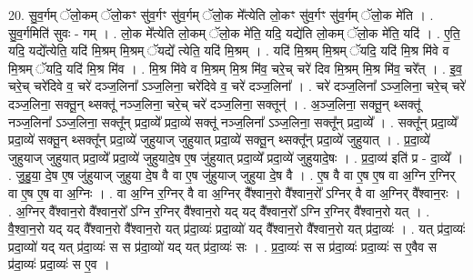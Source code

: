 \documentclass[17pt]{extarticle}
\begin{document}
20. सु॒व॒र्गम् ॅलो॒कम् ॅलो॒कꣳ सु॑व॒र्गꣳ सु॑व॒र्गम् ॅलो॒क मे᳚त्येति लो॒कꣳ सु॑व॒र्गꣳ सु॑व॒र्गम् ॅलो॒क मे॑ति । . सु॒व॒र्गमिति॑ सुवः - गम् । . लो॒क मे᳚त्येति लो॒कम् ॅलो॒क मे॑ति॒ यदि॒ यद्ये॑ति लो॒कम् ॅलो॒क मे॑ति॒ यदि॑ । . ए॒ति॒ यदि॒ यद्ये᳚त्येति॒ यदि॑ मि॒श्रम् मि॒श्रम् ॅयद्ये᳚ त्येति॒ यदि॑ मि॒श्रम् । . यदि॑ मि॒श्रम् मि॒श्रम् ॅयदि॒ यदि॑ मि॒श्र मि॑वे व मि॒श्रम् ॅयदि॒ यदि॑ मि॒श्र मि॑व । . मि॒श्र मि॑वे व मि॒श्रम् मि॒श्र मि॑व॒ चरे॒च् चरे॑ दिव मि॒श्रम् मि॒श्र मि॑व॒ चरे᳚त् । . इ॒व॒ चरे॒च् चरे॑दिवे व॒ चरे॑ दञ्ज॒लिना᳚ ऽञ्ज॒लिना॒ चरे॑दिवे व॒ चरे॑ दञ्ज॒लिना᳚ । . चरे॑ दञ्ज॒लिना᳚ ऽञ्ज॒लिना॒ चरे॒च् चरे॑ दञ्ज॒लिना॒ सक्तू॒न् थ्सक्तू॑ नञ्ज॒लिना॒ चरे॒च् चरे॑ दञ्ज॒लिना॒ सक्तून्॑ । . अ॒ञ्ज॒लिना॒ सक्तू॒न् थ्सक्तू॑ नञ्ज॒लिना᳚ ऽञ्ज॒लिना॒ सक्तू᳚न् प्रदा॒व्ये᳚ प्रदा॒व्ये॑ सक्तू॑ नञ्ज॒लिना᳚ ऽञ्ज॒लिना॒ 
सक्तू᳚न् प्रदा॒व्ये᳚ । . सक्तू᳚न् प्रदा॒व्ये᳚ प्रदा॒व्ये॑ सक्तू॒न् थ्सक्तू᳚न् प्रदा॒व्ये॑ जुहुयाज् जुहुयात् प्रदा॒व्ये॑ सक्तू॒न् थ्सक्तू᳚न् प्रदा॒व्ये॑ जुहुयात् । . प्र॒दा॒व्ये॑ जुहुयाज् जुहुयात् प्रदा॒व्ये᳚ प्रदा॒व्ये॑ जुहुयादे॒ष ए॒ष जु॑हुयात् प्रदा॒व्ये᳚ प्रदा॒व्ये॑ जुहुयादे॒षः । . प्र॒दा॒व्य॑ इति॑ प्र - दा॒व्ये᳚ । . जु॒हु॒या॒ दे॒ष ए॒ष जु॑हुयाज् जुहुया दे॒ष वै वा ए॒ष जु॑हुयाज् जुहुया दे॒ष वै । . ए॒ष वै वा ए॒ष ए॒ष वा अ॒ग्नि र॒ग्निर् वा ए॒ष ए॒ष वा अ॒ग्निः । . वा अ॒ग्नि र॒ग्निर् वै वा अ॒ग्निर् वै᳚श्वान॒रो वै᳚श्वान॒रो᳚ ऽग्निर् वै वा अ॒ग्निर् वै᳚श्वान॒रः । . अ॒ग्निर् वै᳚श्वान॒रो वै᳚श्वान॒रो᳚ ऽग्नि र॒ग्निर् वै᳚श्वान॒रो यद् यद् वै᳚श्वान॒रो᳚ ऽग्नि र॒ग्निर् वै᳚श्वान॒रो यत् । . वै॒श्वा॒न॒रो यद् यद् वै᳚श्वान॒रो वै᳚श्वान॒रो यत् प्र॑दा॒व्यः॑ प्रदा॒व्यो॑ यद् वै᳚श्वान॒रो वै᳚श्वान॒रो यत् प्र॑दा॒व्यः॑ । . यत् प्र॑दा॒व्यः॑ प्रदा॒व्यो॑ यद् यत् प्र॑दा॒व्यः॑ स स प्र॑दा॒व्यो॑ यद् यत् प्र॑दा॒व्यः॑ सः । . प्र॒दा॒व्यः॑ स स प्र॑दा॒व्यः॑ प्रदा॒व्यः॑ स ए॒वैव स प्र॑दा॒व्यः॑ प्रदा॒व्यः॑ स ए॒व । \newline
\end{document}
